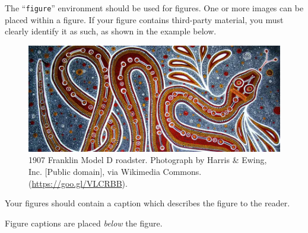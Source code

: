\documentclass[manuscript,screen,review]{acmart}
\begin{document}
{The ``\verb|figure|'' environment should be used for figures. One or
more images can be placed within a figure. If your figure contains
third-party material, you must clearly identify it as such, as shown
in the example below.
\begin{figure}[h]
  \centering
  \includegraphics[width=\linewidth]{snake.jpg}
  \caption{1907 Franklin Model D roadster. Photograph by Harris \&
    Ewing, Inc. [Public domain], via Wikimedia
    Commons. (\url{https://goo.gl/VLCRBB}).}
\end{figure}

Your figures should contain a caption which describes the figure to
the reader.

Figure captions are placed {\itshape below} the figure.
}
\end{document}
